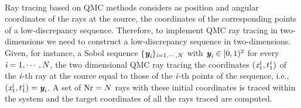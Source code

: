 \\ \indent Ray tracing based on QMC methods considers as position and angular coordinates of the rays at the source, the coordinates of the corresponding points of a low-discrepancy sequence. 
Therefore, to implement QMC ray tracing in two-dimensions we need to construct a low-discrepancy sequence in two-dimensions.  
Given, for instance, a Sobol sequence $\{\textit{\textbf{y}}_{\textit{i}}\}_{\textit{i}=1, \cdots, N}$ with $\textit{\textbf{y}}_{\textit{i}}\in[0,1)^2$ for every $\textit{i}=1, \cdots, N$, the two dimensional QMC ray tracing the coordinates $(\textit{x}_1^{\textit{i}}, t_1^{\textit{i}})$ of the $\textit{i}$-th ray at the source equal to those of the $\textit{i}$-th points of the sequence, i.e., $(\textit{x}_1^{\textit{i}}, t_1^{\textit{i}})=\textit{\textbf{y}}_{\textit{i}}$. A set of $\textrm{Nr} = N$ rays with these initial coordinates is traced within the system and the target coordinates of all the rays traced are computed. \\ \indent 
